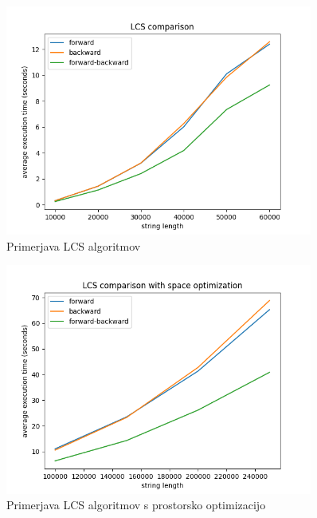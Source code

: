 \documentclass[a4paper,12pt,openright]{book}
\begin{document}
\begin{figure}[htb]
\begin{center}
\includegraphics[width=0.9\textwidth]{plots/LCS_comparison.png}
\end{center}
\caption{Primerjava LCS algoritmov}
\label{comparison1}
\end{figure}

\begin{figure}[htb]
\begin{center}
\includegraphics[width=0.9\textwidth]{plots/LCS_comparison_space.png}
\end{center}
\caption{Primerjava LCS algoritmov s prostorsko optimizacijo}
\label{comparison2}
\end{figure}
\end{document}
